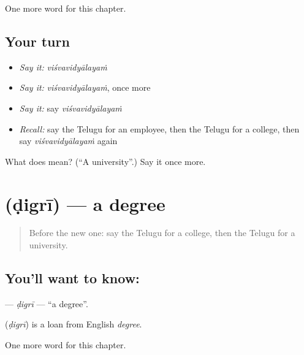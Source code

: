 \begin{grammarlens}[title={What you've built}]
One more word for this chapter.
\end{grammarlens}

\subsection*{Your turn}
\begin{itemize}
\raggedright
  \item \emph{Say it:} \emph{viśvavidyālayaṁ}
  \item \emph{Say it:} \emph{viśvavidyālayaṁ}, once more
  \item \emph{Say it:} say \emph{viśvavidyālayaṁ}
  \item \emph{Recall:} say the Telugu for an employee, then the Telugu for a college, then say \emph{viśvavidyālayaṁ} again
\end{itemize}

\begin{tcolorbox}[breakable,colback=teal!4,colframe=teal!35!black,title={Before you move on}]
What does  mean? (\textquotedblleft{}A university\textquotedblright{}.) Say it once more.
\end{tcolorbox}
\section[\texorpdfstring{\te{డిగ్రీ} (ḍigrī)}{డిగ్రీ (ḍigrī)}]{ (ḍigrī) — a degree}

\label{lesson:TE-C311-digri}



\begin{quote}
Before the new one: say the Telugu for a college, then the Telugu for a university.
\end{quote}

\subsection*{You'll want to know: }
\textbf{} — \emph{ḍigrī} — \textquotedblleft{}a degree\textquotedblright{}.

\begin{cousinweb}
\textbf{} (\emph{ḍigrī}) is a loan from English \emph{degree}.
\end{cousinweb}

\begin{grammarlens}[title={What you've built}]
One more word for this chapter.
\end{grammarlens}


